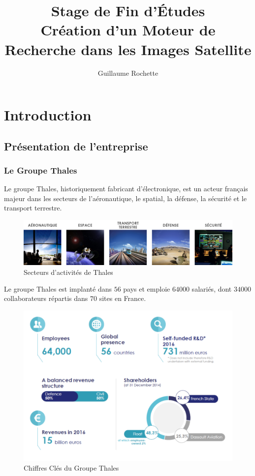 \documentclass[a4paper, 10pt]{report}
\author{Guillaume Rochette}
\title{Stage de Fin d'Études
		\\
Création d'un Moteur de Recherche dans les Images Satellite}
\begin{document}
\maketitle
\tableofcontents
	
\chapter{Introduction}
\section{Présentation de l'entreprise}
\subsection{Le Groupe Thales}
Le groupe Thales, historiquement fabricant d'électronique, est un acteur français majeur dans les secteurs de l'aéronautique, le spatial, la défense, la sécurité et le transport terrestre.
\begin{figure}[H]
	\begin{center}
		\includegraphics[scale=0.3]{Images/Secteurs_Activites.png}
		\caption{Secteurs d'activités de Thales}
	\end{center}
\end{figure}
Le groupe Thales est implanté dans $56$ pays et emploie $64000$ salariés, dont $34000$ collaborateurs répartis dans $70$ sites en France.
\begin{figure}[H]
	\begin{center}
		\includegraphics[scale=0.4]{Images/Chiffres_Cles.png}
		\caption{Chiffres Clés du Groupe Thales}
	\end{center}
\end{figure}
\end{document}
